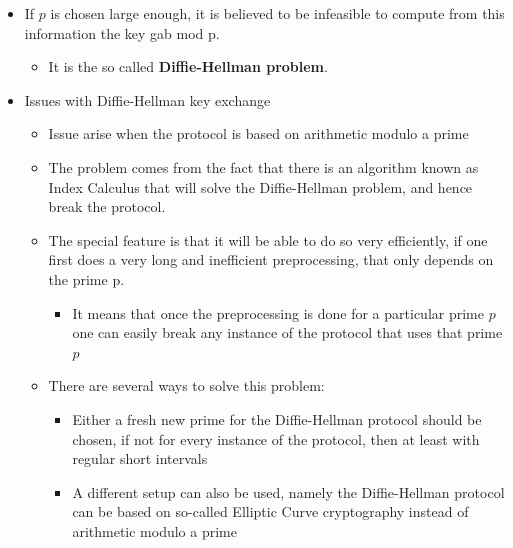 \documentclass[11pt]{article}
\begin{document}
\begin{itemize}
\item If \(p\) is chosen large enough, it is believed to be infeasible to compute from this information the key gab mod p.
\begin{itemize}
\item It is the so called \textbf{Diffie-Hellman problem}.
\end{itemize}

\item Issues with Diffie-Hellman key exchange
\begin{itemize}
\item Issue arise when the protocol is based on arithmetic modulo a prime
\item The problem comes from the fact that there is an algorithm known as Index Calculus that will solve the Diffie-Hellman problem, and hence break the protocol.
\item The special feature is that it will be able to do so very efficiently, if one first does a very long and inefficient preprocessing, that only depends on the prime p.
\begin{itemize}
\item It means that once the preprocessing is done for a particular prime \(p\) one can easily break any instance of the protocol that uses that prime \(p\)
\end{itemize}
\item There are several ways to solve this problem:
\begin{itemize}
\item Either a fresh new prime for the Diffie-Hellman protocol should be chosen, if not for every instance of the protocol, then at least with regular short intervals
\item A different setup can also be used, namely the Diffie-Hellman protocol can be based on so-called Elliptic Curve cryptography instead of arithmetic modulo a prime
\end{itemize}
\end{itemize}
\end{itemize}
\end{document}
